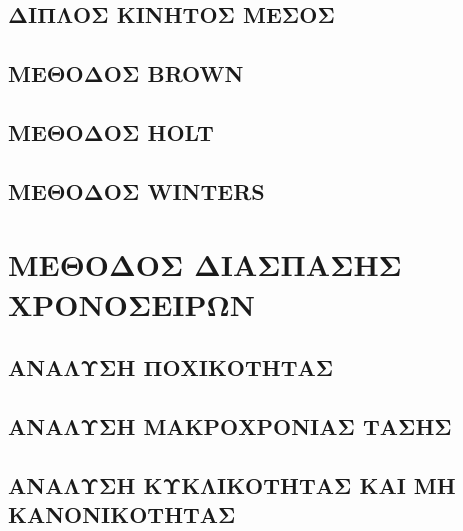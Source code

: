 \subsection{ΔΙΠΛΟΣ ΚΙΝΗΤΟΣ ΜΕΣΟΣ}
\subsection{ΜΕΘΟΔΟΣ BROWN}
\subsection{ ΜΕΘΟΔΟΣ HOLT}
\subsection{ΜΕΘΟΔΟΣ WINTERS}
\section{ΜΕΘΟΔΟΣ ΔΙΑΣΠΑΣΗΣ ΧΡΟΝΟΣΕΙΡΩΝ}
\subsection{ΑΝΑΛΥΣΗ ΠΟΧΙΚΟΤΗΤΑΣ }
\subsection{ΑΝΑΛΥΣΗ ΜΑΚΡΟΧΡΟΝΙΑΣ ΤΑΣΗΣ}
\subsection{ΑΝΑΛΥΣΗ ΚΥΚΛΙΚΟΤΗΤΑΣ ΚΑΙ ΜΗ ΚΑΝΟΝΙΚΟΤΗΤΑΣ}







\endinput
